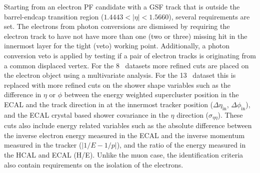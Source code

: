Starting from an electron PF candidate with a GSF track that is outside the barrel-endcap transition region ($1.4443 < |\eta| <1.5660$), several requirements are set. The electrons from photon conversions are dismissed by requiring the electron track to have not have more than one (two or three) missing hit in the innermost layer for the tight (veto) working point. Additionally, a photon conversion veto is applied by testing if a pair of electron tracks is originating from a common displaced vertex. For the 8 \TeV\ datasets more refined cuts are placed on the electron object using a multivariate analysis. For the 13 \TeV\ dataset this is replaced with more refined cuts on the shower shape variables such as the difference in $\eta$ or $\phi$ between the energy weighted supercluster position in the ECAL and the track direction in at the innermost tracker position ($\Delta \eta_{\mathrm{in}}$, $\Delta \phi_{\mathrm{in}}$), and the ECAL crystal based shower covariance in the $\eta$ direction ($\sigma_{\eta \eta}$). These cuts also include energy related variables such as the absolute difference between the inverse electron energy measured in the ECAL and the inverse momentum measured in the tracker ($|1/E-1/p|$), and the ratio of the energy measured in the HCAL and ECAL (H/E). Unlike the muon case, the identification criteria also contain requirements on the isolation of the electrons.

